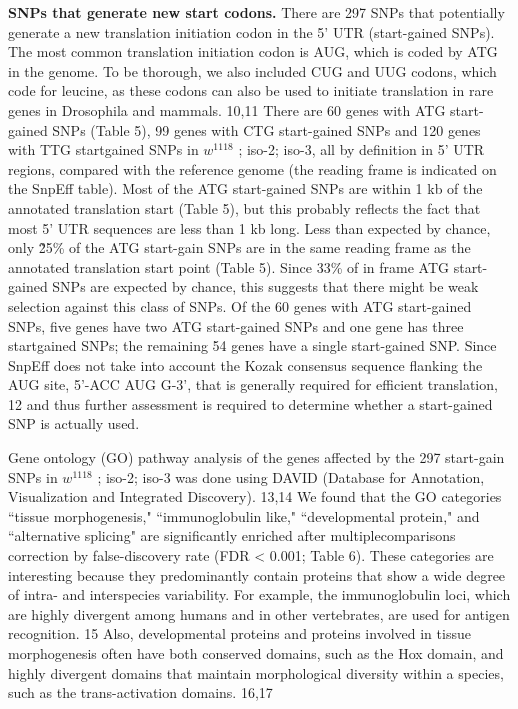 \textbf{SNPs that generate new start codons.} There are 297 SNPs that potentially generate a new translation initiation codon in the 5' UTR (start-gained SNPs). The most common translation initiation codon is AUG, which is coded by ATG in the genome.  To be thorough, we also included CUG and UUG codons, which code for leucine, as these codons can also be used to initiate translation in rare genes in Drosophila and mammals. 10,11 There are 60 genes with ATG start-gained SNPs (Table 5), 99 genes with CTG start-gained SNPs and 120 genes with TTG startgained SNPs in $w^{1118}$ ; iso-2; iso-3, all by definition in 5' UTR regions, compared with the reference genome (the reading frame is indicated on the SnpEff table). Most of the ATG start-gained SNPs are within 1 kb of the annotated translation start (Table 5), but this probably reflects the fact that most 5' UTR sequences are less than 1 kb long. Less than expected by chance, only \~25\% of the ATG start-gain SNPs are in the same reading frame as the annotated translation start point (Table 5). Since 33\% of in frame ATG start-gained SNPs are expected by chance, this suggests that there might be weak selection against this class of SNPs. Of the 60 genes with ATG start-gained SNPs, five genes have two ATG start-gained SNPs and one gene has three startgained SNPs; the remaining 54 genes have a single start-gained SNP. Since SnpEff does not take into account the Kozak consensus sequence flanking the AUG site, 5'-ACC AUG G-3', that is generally required for efficient translation, 12 and thus further assessment is required to determine whether a start-gained SNP is actually used.

Gene ontology (GO) pathway analysis of the genes affected by the 297 start-gain SNPs in $w^{1118}$ ; iso-2; iso-3 was done using DAVID (Database for Annotation, Visualization and Integrated Discovery). 13,14 We found that the GO categories ``tissue morphogenesis," ``immunoglobulin like," ``developmental protein," and ``alternative splicing" are significantly enriched after multiplecomparisons correction by false-discovery rate (FDR < 0.001; Table 6). These categories are interesting because they predominantly contain proteins that show a wide degree of intra- and interspecies variability. For example, the immunoglobulin loci, which are highly divergent among humans and in other vertebrates, are used for antigen recognition. 15 Also, developmental proteins and proteins involved in tissue morphogenesis often have both conserved domains, such as the Hox domain, and highly divergent domains that maintain morphological diversity within a species, such as the trans-activation domains. 16,17

